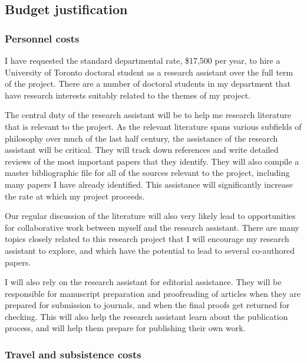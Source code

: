 \documentclass[12pt]{article}
\begin{document}
\subsection*{Budget justification}

\subsubsection*{Personnel costs}

I have requested the standard departmental rate, \$17,500 per year, to hire a University of Toronto doctoral student as a research assistant over the full term of the project. There are a number of doctoral students in my department that have research interests suitably related to the themes of my project. 

The central duty of the research assistant will be to help me research literature that is relevant to the project. As the relevant literature spans various subfields of philosophy over much of the last half century, the assistance of the research assistant will be critical. They will track down references and write detailed reviews of the most important papers that they identify. They will also compile a master bibliographic file for all of the sources relevant to the project, including many papers I have already identified. This assistance will significantly increase the rate at which my project proceeds.

Our regular discussion of the literature will also very likely lead to opportunities for collaborative work between myself and the research assistant. There are many topics closely related to this research project that I will encourage my research assistant to explore, and which have the potential to lead to several co-authored papers.

I will also rely on the research assistant for editorial assistance. They will be responsible for manuscript preparation and proofreading of articles when they are prepared for submission to journals, and when the final proofs get returned for checking. This will also help the research assistant learn about the publication process, and will help them prepare for publishing their own work.


\subsubsection*{Travel and subsistence costs}
\end{document}
